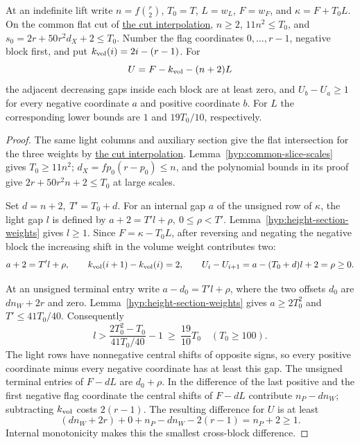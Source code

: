 \begin{established}
\label{hyp:three-determinant-weight-ranks}\label{cor:paired-cusp-ranks-7}
At an indefinite lift write \(n=f\binom r2\), \(T_0=T\),
\(L=w_L\), \(F=w_F\), and \(\kappa=F+T_0 L\). On the common
flat cut of \hyperref[par:slice-interpolation]{the cut interpolation},
\(n\ge2\), \(11n^2\le T_0\), and \(s_0=2r+50r^2d_X+2\le T_0\).
Number the flag coordinates \(0,\ldots,r-1\), negative block first,
and put \(k_{\rm vol}(i)=2i-(r-1)\). For
\[
                   U=F-k_{\rm vol}-(n+2)L
\]
the adjacent decreasing gaps inside each block are at least zero,
and \(U_b-U_a\ge1\) for every negative coordinate \(a\) and
positive coordinate \(b\). For \(L\) the corresponding lower
bounds are \(1\) and \(19T_0/10\), respectively.
\end{established}
\begin{proof}
The same light columns and auxiliary section give the flat
intersection for the three weights by
\hyperref[par:slice-interpolation]{the cut interpolation}.
Lemma~\ref{hyp:common-slice-scales} gives \(T_0\ge11n^2\);
\(d_X=fp_0(r-p_0)\le n\), and the polynomial bounds in its proof
give \(2r+50r^2n+2\le T_0\) at large scales.

Set \(d=n+2,\ T'=T_0+d\). For an internal gap \(a\) of the
unsigned row of \(\kappa\), the light gap \(l\) is defined by
\(a+2=T'l+\rho,\ 0\le\rho<T'\).
Lemma~\ref{hyp:height-section-weights} gives \(l\ge1\).
Since \(F=\kappa-T_0L\), after reversing and negating the negative
block the increasing shift in the volume weight contributes two:
\[
 a+2=T'l+\rho,\qquad k_{\rm vol}(i+1)-k_{\rm vol}(i)=2,\qquad
 U_i-U_{i+1}=a-(T_0+d)l+2=\rho\ge0 .
\]

At an unsigned terminal entry write
\(a-d_0=T'l+\rho\), where the two offsets \(d_0\) are \(dn_W+2r\)
and zero. Lemma~\ref{hyp:height-section-weights} gives \(a\ge2T_0^2\)
and \(T'\le41T_0/40\). Consequently
\[
 l>\frac{2T_0^2-T_0}{41T_0/40}-1\ \ge\ \frac{19}{10}T_0
 \quad(T_0\ge 100).
\]
The light rows have nonnegative central shifts of opposite signs,
so every positive coordinate minus every negative coordinate has
at least this gap. The unsigned terminal entries of \(F-dL\) are
\(d_0+\rho\). In the difference of the last positive and the first
negative flag coordinate the central shifts of \(F-dL\) contribute
\(n_P-dn_W\); subtracting \(k_{\rm vol}\) costs \(2(r-1)\).
The resulting difference for \(U\) is at least
\[
 (dn_W+2r)+0+n_P-dn_W-2(r-1)=n_P+2\ge1 .
\]
Internal monotonicity makes this the smallest cross-block difference.
\end{proof}

